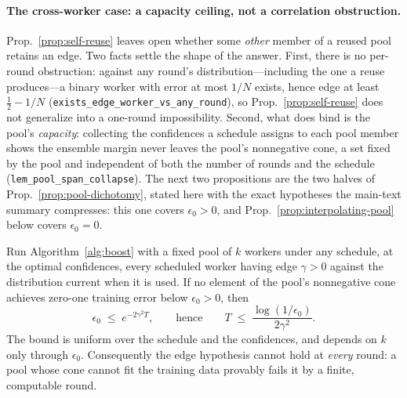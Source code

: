 \paragraph{The cross-worker case: a capacity ceiling, not a correlation obstruction.} Prop.~\ref{prop:self-reuse} leaves open whether some \emph{other} member of a reused pool retains an edge. Two facts settle the shape of the answer. First, there is no per-round obstruction: against any round's distribution---including the one a reuse produces---a binary worker with error at most $1/N$ exists, hence edge at least $\tfrac12-1/N$ (\texttt{exists\_edge\_worker\_vs\_any\_round}), so Prop.~\ref{prop:self-reuse} does not generalize into a one-round impossibility. Second, what does bind is the pool's \emph{capacity}: collecting the confidences a schedule assigns to each pool member shows the ensemble margin never leaves the pool's nonnegative cone, a set fixed by the pool and independent of both the number of rounds and the schedule (\texttt{lem\_pool\_span\_collapse}). The next two propositions are the two halves of Prop.~\ref{prop:pool-dichotomy}, stated here with the exact hypotheses the main-text summary compresses: this one covers $\epsilon_0>0$, and Prop.~\ref{prop:interpolating-pool} below covers $\epsilon_0{=}0$.

\begin{proposition}
\label{prop:pool-horizon}
Run Algorithm~\ref{alg:boost} with a fixed pool of $k$ workers under any schedule, at the optimal confidences, every scheduled worker having edge $\gamma>0$ against the distribution current when it is used. If no element of the pool's nonnegative cone achieves zero-one training error below $\epsilon_0>0$, then
\[
\epsilon_0 \;\le\; e^{-2\gamma^2 T}, \qquad\text{hence}\qquad T \;\le\; \frac{\log(1/\epsilon_0)}{2\gamma^2}.
\]
The bound is uniform over the schedule and the confidences, and depends on $k$ only through $\epsilon_0$. Consequently the edge hypothesis cannot hold at \emph{every} round: a pool whose cone cannot fit the training data provably fails it by a finite, computable round.
\end{proposition}


